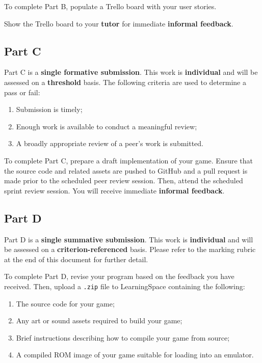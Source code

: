 \documentclass{../../fal_assignment}
\begin{document}
To complete Part B, populate a Trello board with your user stories.

Show the Trello board to your \textbf{tutor} for immediate \textbf{informal feedback}.

\subsection*{Part C}

Part C is a \textbf{single formative submission}. This work is \textbf{individual} and will be assessed on a \textbf{threshold} basis. The following criteria are used to determine a pass or fail:

\begin{enumerate}[label=(\alph*)]
	\item Submission is timely;
	\item Enough work is available to conduct a meaningful review;
	\item A broadly appropriate review of a peer's work is submitted.
\end{enumerate}

To complete Part C, prepare a draft implementation of your game. Ensure that the source code and related assets are pushed to GitHub and a pull request is made prior to the scheduled peer review session. Then, attend the scheduled sprint review session. You will receive immediate \textbf{informal feedback}.

\subsection*{Part D}

Part D is a \textbf{single summative submission}. This work is \textbf{individual} and will be assessed on a \textbf{criterion-referenced} basis. Please refer to the marking rubric at the end of this document for further detail.

To complete Part D, revise your program based on the feedback you have received. Then, upload a \texttt{.zip} file to LearningSpace containing the following:

\begin{enumerate}[label=(\alph*)]
	\item The source code for your game;
	\item Any art or sound assets required to build your game;
	\item Brief instructions describing how to compile your game from source;
	\item A compiled ROM image of your game suitable for loading into an emulator.
\end{enumerate}
\end{document}
